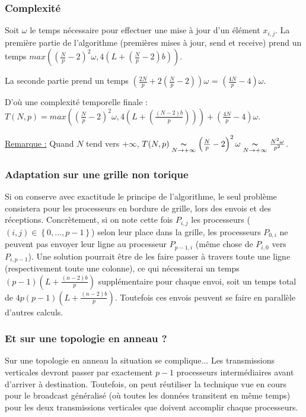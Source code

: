 \documentclass{article}
\begin{document}
\subsubsection*{Complexité}

Soit $\omega$ le temps nécessaire pour effectuer une mise à jour d'un élément $x_{i,j}$.
La première partie de l'algorithme (premières mises à jour, send et receive) prend un temps $max \left( (\frac{N}{p}-2)^2\omega, 4(L + (\frac{N}{p}-2)b) \right) $.

La seconde partie prend un temps $(\frac{2N}{p} + 2(\frac{N}{p}-2))\omega$ = $(\frac{4N}{p}-4)\omega$.

D'où une complexité temporelle finale : $T(N,p) = max \left( \left(\frac{N}{p}-2\right)^2\omega, 4\left(L + \left(\frac{(N-2)b}{p}\right) \right) \right)  + \left(\frac{4N}{p}-4 \right)\omega $.

\underline{Remarque :} Quand $N$ tend vers $+\infty$, $T(N,p) \underset{N \rightarrow +\infty}{\thicksim} \left(\frac{N}{p}-2\right)^2\omega \underset{N \rightarrow +\infty}{\thicksim} \frac{N^2\omega}{p^2}$. 

\subsubsection*{Adaptation sur une grille non torique}

Si on conserve avec exactitude le principe de l'algorithme, le seul problème consistera pour les processeurs en bordure de grille, lors des envois et des réceptions.
Concrètement, si on note cette fois $P_{i,j}$ les processeurs ($(i,j) \in \left\{ 0, \dots,p-1\right\}$) selon leur place dans la grille, les processeurs $P_{0,i}$ ne peuvent pas envoyer leur ligne au processeur $P_{p-1,i}$ (même chose de $P_{i,0}$ vers $P_{i,p-1}$).
Une solution pourrait être de les faire passer à travers toute une ligne (respectivement toute une colonne), ce qui nécessiterai un temps $(p-1)(L + \frac{(n-2)b}{p})$ supplémentaire pour chaque envoi, soit un temps total de $4p(p-1)(L + \frac{(n-2)b}{p})$. Toutefois ces envois peuvent se faire en parallèle d'autres calculs. %

\subsubsection*{Et sur une topologie en anneau ?}

Sur une topologie en anneau la situation se complique... Les transmissions verticales devront passer par exactement $p-1$ processeurs intermédiaires avant d'arriver à destination. Toutefois, on peut réutiliser la technique vue en cours pour le broadcast généralisé (où toutes les données transitent en même temps) pour les deux transmissions verticales que doivent accomplir chaque processeurs.
\end{document}
